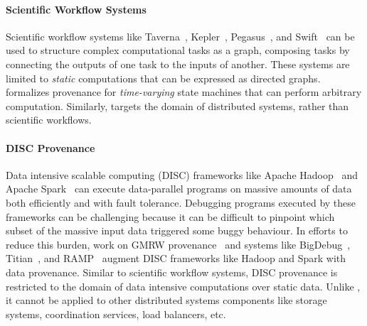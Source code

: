 \paragraph{Scientific Workflow Systems}
Scientific workflow systems like Taverna~\cite{wolstencroft2013taverna},
Kepler~\cite{altintas2006provenance}, Pegasus~\cite{kim2008provenance}, and
Swift~\cite{wozniak2013swift} can be used to structure complex computational
tasks as a graph, composing tasks by connecting the outputs of one task to the
inputs of another. 
These systems are limited to \emph{static} computations that
can be expressed as directed graphs. \watprovenance{} formalizes provenance for
\emph{time-varying} state machines that can perform arbitrary computation.
Similarly, \fluent{} targets the domain of distributed systems, rather than
scientific workflows.

\paragraph{DISC Provenance}
Data intensive scalable computing (DISC) frameworks like Apache
Hadoop~\cite{shvachko2010hadoop} and Apache Spark~\cite{zaharia2010spark} can
execute data-parallel programs on massive amounts of data both efficiently and
with fault tolerance. Debugging programs executed by these frameworks can be
challenging because it can be difficult to pinpoint which subset of the massive
input data triggered some buggy behaviour. In efforts to reduce this burden,
work on GMRW provenance~\cite{ikeda2011provenance} and systems like
BigDebug~\cite{gulzar2016bigdebug}, Titian~\cite{interlandi2015titian}, and
RAMP~\cite{park2011ramp} augment DISC frameworks like Hadoop and Spark with
data provenance. Similar to scientific workflow systems, DISC provenance is
restricted to the domain of data intensive computations over static data.
Unlike \watprovenance{}, it cannot be applied to other distributed systems
components like storage systems, coordination services, load balancers, etc.

